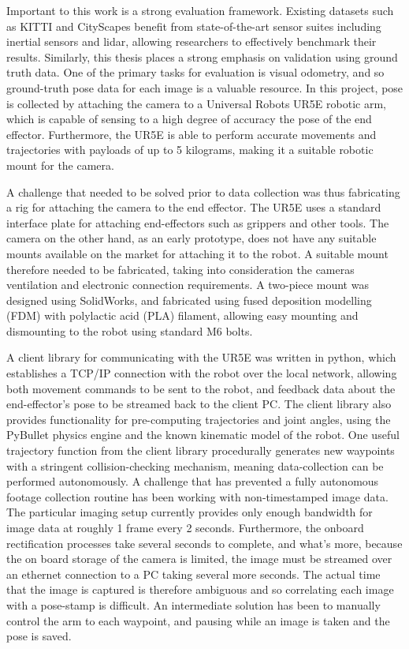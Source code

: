 Important to this work is a strong evaluation framework. Existing datasets such as KITTI and CityScapes benefit from state-of-the-art sensor suites including inertial sensors and lidar, allowing researchers to effectively benchmark their results. Similarly, this thesis places a strong emphasis on validation using ground truth data. One of the primary tasks for evaluation is visual odometry, and so ground-truth pose data for each image is a valuable resource. In this project, pose is collected by attaching the camera to a Universal Robots UR5E robotic arm, which is capable of sensing to a high degree of accuracy the pose of the end effector. Furthermore, the UR5E is able to perform accurate movements and trajectories with payloads of up to 5 kilograms, making it a suitable robotic mount for the camera. 

A challenge that needed to be solved prior to data collection was thus fabricating a rig for attaching the camera to the end effector. The UR5E uses a standard interface plate for attaching end-effectors such as grippers and other tools. The camera on the other hand, as an early prototype, does not have any suitable mounts available on the market for attaching it to the robot. A suitable mount therefore needed to be fabricated, taking into consideration the cameras ventilation and electronic connection requirements. A two-piece mount was designed using SolidWorks, and fabricated using fused deposition modelling (FDM) with polylactic acid (PLA) filament, allowing easy mounting and dismounting to the robot using standard M6 bolts. 

A client library for communicating with the UR5E was written in python, which establishes a TCP/IP connection with the robot over the local network, allowing both movement commands to be sent to the robot, and feedback data about the end-effector's pose to be streamed back to the client PC. The client library also provides functionality for pre-computing trajectories and joint angles, using the PyBullet physics engine and the known kinematic model of the robot. One useful trajectory function from the client library procedurally generates new waypoints with a stringent collision-checking mechanism, meaning data-collection can be performed autonomously. A challenge that has prevented a fully autonomous footage collection routine has been working with non-timestamped image data. The particular imaging setup currently provides only enough bandwidth for image data at roughly 1 frame every 2 seconds. Furthermore, the onboard rectification processes take several seconds to complete, and what's more, because the on board storage of the camera is limited, the image must be streamed over an ethernet connection to a PC taking several more seconds. The actual time that the image is captured is therefore ambiguous and so correlating each image with a pose-stamp is difficult. An intermediate solution has been to manually control the arm to each waypoint, and pausing while an image is taken and the pose is saved. 

